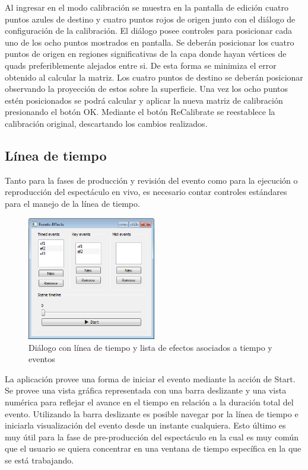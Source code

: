 Al ingresar en el modo calibración se muestra en la pantalla de edición cuatro puntos azules de destino y cuatro puntos rojos de origen junto con el diálogo de configuración de la calibración.
El diálogo posee controles para posicionar cada uno de los ocho puntos mostrados en pantalla. Se deberán posicionar los cuatro puntos de origen en regiones significativas de la capa donde hayan vértices de quads preferiblemente alejados entre si. De esta forma se minimiza el error obtenido al calcular la matriz.
Los cuatro puntos de destino se deberán posicionar observando la proyección de estos sobre la superficie. Una vez los ocho puntos estén posicionados se podrá calcular y aplicar la nueva matriz de calibración presionando el botón OK.
Mediante el botón ReCalibrate se reestablece la calibración original, descartando los cambios realizados.

\subsection{Línea de tiempo}

Tanto para la fases de producción y revisión del evento como para la ejecución o reproducción del espectáculo en vivo, es necesario contar controles estándares para el manejo de la línea de tiempo.

\begin{figure}[H]
  \centering
    \includegraphics[width=0.5\textwidth]{./Cap5_vmt/vmt_events_effects.png}
  \caption{Diálogo con línea de tiempo y lista de efectos asociados a tiempo y eventos}
  \label{fig:VMT-Timeline}
\end{figure}

La aplicación provee una forma de iniciar el evento mediante la acción de Start. Se provee una vista gráfica representada con una barra deslizante y una vista numérica para reflejar el avance en el tiempo en relación a la duración total del evento. Utilizando la barra deslizante es posible navegar por la línea de tiempo e iniciarla visualización del evento desde un instante cualquiera. Esto último es muy útil para la fase de pre-producción del espectáculo en la cual es muy común que el usuario se quiera concentrar en una ventana de tiempo específica en la que se está trabajando.


